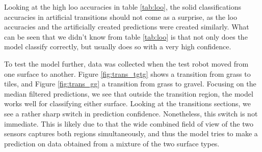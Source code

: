Looking at the high \gls{loo} accuracies in table \ref{tab:loo}, the solid classifications accuracies in artificial transitions should not come as a surprise, as the \gls{loo} accuracies and the artificially created predictions were created similarly. What can be seen that we didn't know from table \ref{tab:loo} is that not only does the model classify correctly, but usually  does so with a very high confidence. 

To test the model further, data was collected when the test robot moved from one surface to another. Figure \ref{fig:trans_tgtg} shows a transition from grass to tiles, and Figure \ref{fig:trans_gg} a transition from grass to gravel. Focusing on the median filtered predictions, we see that outside the transition region, the model works well for classifying either surface. Looking at the transitions sections, we see a rather sharp switch in prediction confidence. Nonetheless, this switch is not immediate. This is likely due to that the wide combined field of view of the two sensors captures both regions simultaneously, and thus the model tries to make a prediction on data obtained from a mixture of the two surface types. 


